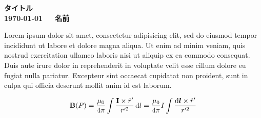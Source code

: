 \documentclass[dvipdfmx, 12pt, a4paper, uplatex]{jsarticle}
\begin{document}
  \begin{center}\bfseries
    {\Large タイトル}\\
    {\large\today~~~名前}
  \end{center}

  Lorem ipsum dolor sit amet, consectetur adipisicing elit, sed do eiusmod tempor incididunt ut labore et dolore magna aliqua. Ut enim ad minim veniam, quis nostrud exercitation ullamco laboris nisi ut aliquip ex ea commodo consequat. Duis aute irure dolor in reprehenderit in voluptate velit esse cillum dolore eu fugiat nulla pariatur. Excepteur sint occaecat cupidatat non proident, sunt in culpa qui officia deserunt mollit anim id est laborum.

  \begin{align}
    \mathbf{B}(P) = \frac{\mu_0}{4\pi}\int \frac{\mathbf{I}\times \hat{r}'}{r'^2} \dd{l}
    = \frac{\mu_0}{4\pi} I \int \frac{\dd{\bm{l}}\times \hat{r}'}{r'^2}
  \end{align}

  
  
\end{document}
